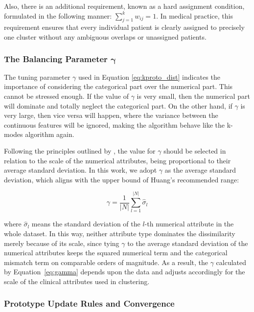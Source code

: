 Also, there is an additional requirement, known as a hard assignment condition, formulated in the following manner: $\sum_{j=1}^k w_{ij}=1$. In medical practice, this requirement ensures that every individual patient is clearly assigned to precisely one cluster without any ambiguous overlaps or unassigned patients.

\subsubsection*{The Balancing Parameter $\boldsymbol{\gamma}$}

The tuning parameter $\gamma$ used in Equation \ref{eq:kproto_dist} indicates the importance of considering the categorical part over the numerical part. This cannot be stressed enough. If the value of $\gamma$ is very small, then the numerical part will dominate and totally neglect the categorical part. On the other hand, if $\gamma$ is very large, then vice versa will happen, where the variance between the continuous features will be ignored, making the algorithm behave like the k-modes algorithm again.

Following the principles outlined by \cite{huang1998}, the value for $\gamma$ should be selected in relation to the scale of the numerical attributes, being proportional to their average standard deviation. In this work, we adopt $\gamma$ as the average standard deviation, which aligns with the upper bound of Huang's recommended range:

\begin{equation}
    \gamma = \frac{1}{|N|} \sum_{l=1}^{|N|} \hat{\sigma}_l
    \label{eq:gamma}
\end{equation}

where $\hat{\sigma}_l$ means the standard deviation of the $l$-th numerical attribute in the whole dataset. In this way, neither attribute type dominates the dissimilarity merely because of its scale, since tying $\gamma$ to the average standard deviation of the numerical attributes keeps the squared numerical term and the categorical mismatch term on comparable orders of magnitude. As a result, the $\gamma$ calculated by Equation~\eqref{eq:gamma} depends upon the data and adjusts accordingly for the scale of the clinical attributes used in clustering.

\subsubsection*{Prototype Update Rules and Convergence}

